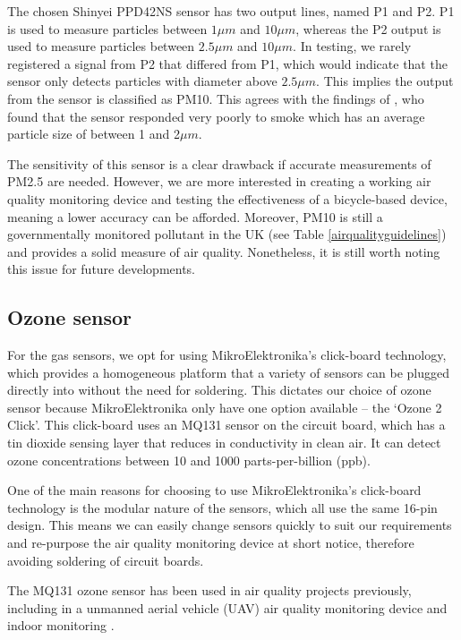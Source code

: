 \documentclass[11pt]{report}
\begin{document}
The chosen Shinyei PPD42NS sensor has two output lines, named P1 and P2. P1 is used to measure particles between $1\mu m$ and $10\mu m$, whereas the P2 output is used to measure particles between $2.5\mu m$ and $10\mu m$. In testing, we rarely registered a signal from P2 that differed from P1, which would indicate that the sensor only detects particles with diameter above $2.5\mu m$. This implies the output from the sensor is classified as PM10. This agrees with the findings of \cite{thorpe2017RPimesh}, who found that the sensor responded very poorly to smoke which has an average particle size of between 1 and 2$\mu m$.

The sensitivity of this sensor is a clear drawback if accurate measurements of PM2.5 are needed. However, we are more interested in creating a working air quality monitoring device and testing the effectiveness of a bicycle-based device, meaning a lower accuracy can be afforded. Moreover, PM10 is still a governmentally monitored pollutant in the UK (see Table \ref{airqualityguidelines}) and provides a solid measure of air quality. Nonetheless, it is still worth noting this issue for future developments.

\subsection{Ozone sensor}

For the gas sensors, we opt for using MikroElektronika's click-board technology, which provides a homogeneous platform that a variety of sensors can be plugged directly into without the need for soldering. This dictates our choice of ozone sensor because MikroElektronika only have one option available -- the `Ozone 2 Click'. This click-board uses an MQ131 sensor on the circuit board, which has a tin dioxide sensing layer that reduces in conductivity in clean air. It can detect ozone concentrations between 10 and 1000 parts-per-billion (ppb).

One of the main reasons for choosing to use MikroElektronika's click-board technology is the modular nature of the sensors, which all use the same 16-pin design. This means we can easily change sensors quickly to suit our requirements and re-purpose the air quality monitoring device at short notice, therefore avoiding soldering of circuit boards.

The MQ131 ozone sensor has been used in air quality projects previously, including in a unmanned aerial vehicle (UAV) air quality monitoring device \citep{alvear2017uav} and indoor monitoring \citep{Abraham2014costeffindoor}.
\end{document}
